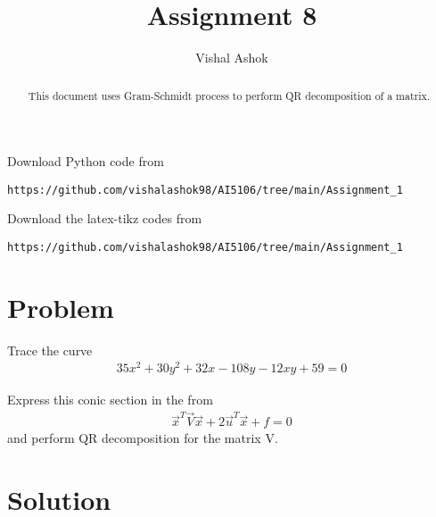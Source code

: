 \documentclass[journal,12pt,twocolumn]{IEEEtran}
\begin{document}
\renewcommand{\thefigure}{\theproblem}
\def\putbox#1#2#3{\makebox[0in][l]{\makebox[#1][l]{}\raisebox{\baselineskip}[0in][0in]{\raisebox{#2}[0in][0in]{#3}}}}
     \def\rightbox#1{\makebox[0in][r]{#1}}
     \def\centbox#1{\makebox[0in]{#1}}
     \def\topbox#1{\raisebox{-\baselineskip}[0in][0in]{#1}}
     \def\midbox#1{\raisebox{-0.5\baselineskip}[0in][0in]{#1}}
\vspace{3cm}
\title{Assignment 8}
\author{Vishal Ashok}
\maketitle
\newpage
\bigskip
\renewcommand{\thefigure}{\theenumi}
\renewcommand{\thetable}{\theenumi}
\begin{abstract}
This document uses  Gram-Schmidt process to perform QR decomposition of a matrix.
\end{abstract}
Download Python code from 
%
\begin{lstlisting}
https://github.com/vishalashok98/AI5106/tree/main/Assignment_1
\end{lstlisting}
%
Download the latex-tikz codes from 
%
\begin{lstlisting}
https://github.com/vishalashok98/AI5106/tree/main/Assignment_1
\end{lstlisting}
%

\section{Problem}

Trace the curve
\begin{align}
35x^2+30y^2+32x-108y-12xy+59=0 \label{given_curve_eq}
\end{align}

Express this conic section in the from
\begin{align}
\vec{x}^T\vec{V}\vec{x}+2\vec{u}^T\vec{x}+f=0 \label{conic_quad_eqn}
\end{align} 
and perform QR decomposition for the matrix V.




\section{Solution}
\end{document}
